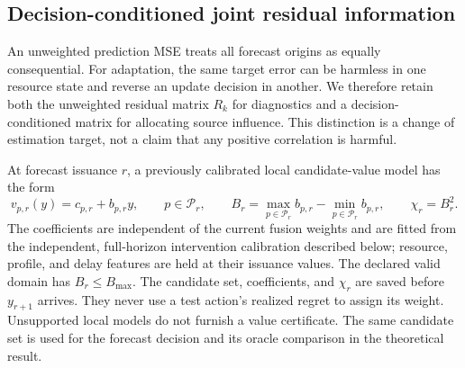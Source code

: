 \documentclass[10pt]{article}
\begin{document}
\subsection{Decision-conditioned joint residual information}
\label{sec:decision-moment}

An unweighted prediction MSE treats all forecast origins as equally consequential.
For adaptation, the same target error can be harmless in one resource state and
reverse an update decision in another. We therefore retain both the unweighted
residual matrix $R_k$ for diagnostics and a decision-conditioned matrix for
allocating source influence. This distinction is a change of estimation target,
not a claim that any positive correlation is harmful.

At forecast issuance $r$, a previously calibrated local candidate-value model
has the form
\begin{equation}
 v_{p,r}(y)=c_{p,r}+b_{p,r}y,\qquad p\in\mathcal P_r,
 \qquad B_r=\max_{p\in\mathcal P_r}b_{p,r}
              -\min_{p\in\mathcal P_r}b_{p,r},
 \qquad\chi_r=B_r^2.
 \label{eq:issuance-decision-weight}
\end{equation}
The coefficients are independent of the current fusion weights and are fitted from the independent, full-horizon
intervention calibration described below; resource, profile, and delay features
are held at their issuance values. The declared valid domain has $B_r\le B_{\max}$.
The candidate set, coefficients, and $\chi_r$ are saved before $y_{r+1}$ arrives.
They never use a test action's realized regret to assign its weight. Unsupported
local models do not furnish a value certificate. The same candidate set is used
for the forecast decision and its oracle comparison in the theoretical result.
\end{document}
